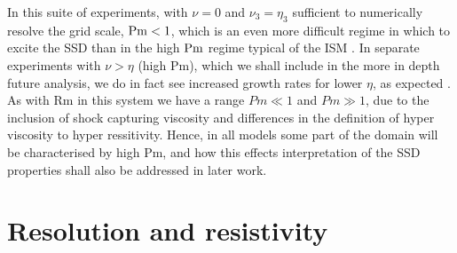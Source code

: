 \documentclass[preprint2]{aastex63}
\newcommand\Pm{{\rm Pm} }
\begin{document}
In this suite of experiments, with $\nu=0$ and $\nu_3=\eta_3$ sufficient to
numerically resolve the grid scale, $\Pm<1$, which is an even more difficult
regime in which to excite the SSD than in the high $\Pm$
regime typical of the ISM \citep{HBD04}.
In separate experiments with $\nu>\eta$ (high Pm), which we shall include in
the more in depth future analysis, we do in fact see increased growth rates
for lower $\eta$, as expected \citep{Sch07}.
As with Rm in this system we have a range $Pm\ll1$ and $Pm\gg1$, due to the
inclusion of shock capturing viscosity and differences in the definition of
hyper viscosity to hyper ressitivity.
Hence, in all models some part of the domain will be characterised by high Pm,
and how this effects interpretation of the SSD properties shall also be
addressed in later work.
%
\section{Resolution and resistivity} \label{sec:results}
\end{document}
